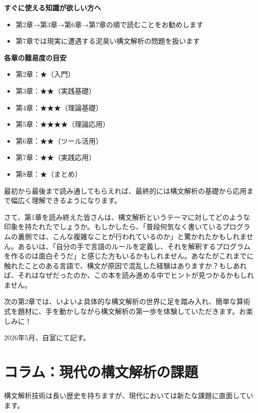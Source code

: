 \textbf{すぐに使える知識が欲しい方へ}

\begin{itemize}
\tightlist
\item
  第2章→第3章→第6章→第7章の順で読むことをお勧めします
\item
  第7章では現実に遭遇する泥臭い構文解析の問題を扱います
\end{itemize}

\textbf{各章の難易度の目安}

\begin{itemize}
\tightlist
\item
  第2章：★（入門）
\item
  第3章：★★（実践基礎）
\item
  第4章：★★★（理論基礎）
\item
  第5章：★★★★（理論応用）
\item
  第6章：★★（ツール活用）
\item
  第7章：★★（実践応用）
\item
  第8章：★（まとめ）
\end{itemize}

最初から最後まで読み通してもらえれば、最終的には構文解析の基礎から応用まで幅広く理解できるようになります。

さて、第1章を読み終えた皆さんは、構文解析というテーマに対してどのような印象を持たれたでしょうか。もしかしたら、「普段何気なく書いているプログラムの裏側では、こんな複雑なことが行われているのか」と驚かれたかもしれません。あるいは、「自分の手で言語のルールを定義し、それを解釈するプログラムを作るのは面白そうだ」と感じた方もいるかもしれません。あなたがこれまでに触れたことのある言語で、構文が原因で混乱した経験はありますか？もしあれば、それはなぜだったのか、この本を読み進める中でヒントが見つかるかもしれません。

次の第2章では、いよいよ具体的な構文解析の世界に足を踏み入れ、簡単な算術式を題材に、手を動かしながら構文解析の第一歩を体験していただきます。お楽しみに！

2026年5月、自室にて記す。

\hypertarget{chapter1-ux30b3ux30e9ux30e0ux73feux4ee3ux306eux69cbux6587ux89e3ux6790ux306eux8ab2ux984c}{%
\section{コラム：現代の構文解析の課題}\label{chapter1-ux30b3ux30e9ux30e0ux73feux4ee3ux306eux69cbux6587ux89e3ux6790ux306eux8ab2ux984c}}

構文解析技術は長い歴史を持ちますが、現代においては新たな課題に直面しています。

